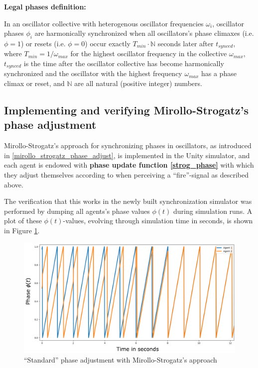 	\textbf{Legal phases definition:} \nl

	In an oscillator collective with heterogenous oscillator frequencies $\omega_i$, oscillator phases $\phi_i$ are harmonically synchronized when all oscillators's phase climaxes (i.e. $\phi=1$) or resets (i.e. $\phi=0$) occur exactly $T_{min} \cdot \mathbb{N}$ seconds later after $t_{synced}$, where $T_{min}=1/\omega_{max}$ for the highest oscillator frequency in the collective $\omega_{max}$, $t_{synced}$ is the time after the oscillator collective has become harmonically synchronized and the oscillator with the highest frequency $\omega_{max}$ has a phase climax or reset, and $\mathbb{N}$ are all natural (positive integer) numbers.
	
		\subsection{Implementing and verifying Mirollo-Strogatz's phase adjustment} %
		
		Mirollo-Strogatz's approach for synchronizing phases in oscillators, as introduced in \ref{mirollo_strogatz_phase_adjust}, is implemented in the Unity simulator, and each agent is endowed with \textbf{phase update function \eqref{strog_phase}} with which they adjust themselves according to when perceiving a ``fire''-signal as described above.
		
		The verification that this works in the newly built synchronization simulator was performed by dumping all agents's phase values $\phi(t)$ during simulation runs. A plot of these $\phi(t)$-values, evolving through simulation time in seconds, is shown in Figure \ref{fig:strog_phase}.
		
		\begin{figure}[h]
			\centering
			\includegraphics[width=0.9\linewidth]{Assets/DocSegments/Chapters/ExperimentsAndResults/Figures/Validations/MirolloStrogatzPhaseAdjustmentSecondTry.pdf}
			\caption[Illustration of Mirollo \& Strogatz's ``standard'' phase adjustment ($Adj_{\phi}$) method.]{``Standard'' phase adjustment with Mirollo-Strogatz's approach}
			\label{fig:strog_phase}
		\end{figure}
		
